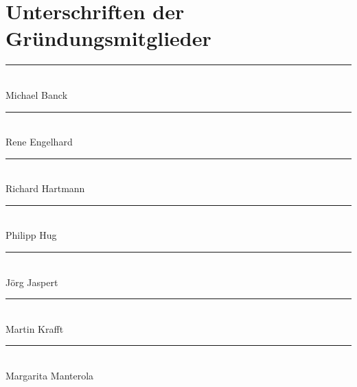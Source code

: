 \documentclass[draft]{scrartcl}
\begin{document}
\pagebreak\section*{Unterschriften der Gründungsmitglieder}

\vspace{3em}

\rule{6cm}{0.4pt} \\
\noindent Michael Banck \\
\vspace{2em}

\rule{6cm}{0.4pt} \\
\noindent Rene Engelhard \\
\vspace{2em}

\rule{6cm}{0.4pt} \\
\noindent Richard Hartmann \\
\vspace{2em}

\rule{6cm}{0.4pt} \\
\noindent Philipp Hug \\
\vspace{2em}

\rule{6cm}{0.4pt} \\
\noindent Jörg Jaspert \\
\vspace{2em}

\rule{6cm}{0.4pt} \\
\noindent Martin Krafft \\
\vspace{2em}

\rule{6cm}{0.4pt} \\
\noindent Margarita Manterola
\end{document}
